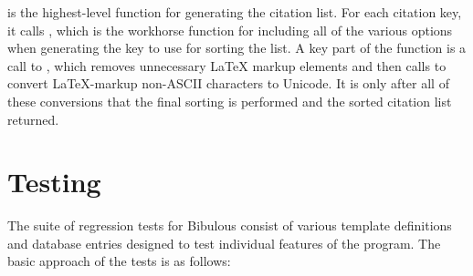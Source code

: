 \documentclass[letterpaper,10pt,english]{sphinxmanual}
\begin{document}
 is the highest-level function for generating the citation list. For each citation key, it calls , which is the workhorse function for including all of the various options when generating the key to use for sorting the list. A key part of the function is a call to , which removes unnecessary LaTeX markup elements and then calls  to convert LaTeX-markup non-ASCII characters to Unicode. It is only after all of these conversions that the final sorting is performed and the sorted citation list returned.


\section{Testing}
\label{\detokenize{developer_guide:testing}}
The suite of regression tests for Bibulous consist of various template definitions and database entries designed to test individual features of the program. The basic approach of the tests is as follows:
\end{document}
